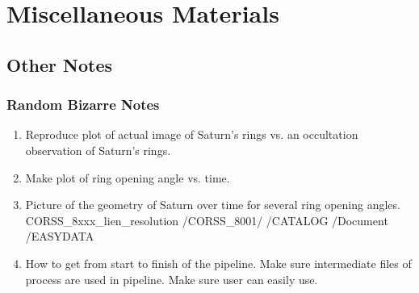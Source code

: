 \documentclass[crop=false,class=article,oneside]{standalone}
\begin{document}
    \ifx\ifphysicscourseselectromagnetismI\undefined
        \section*{Miscellaneous Materials}
        \setcounter{section}{1}
    \fi
    \subsection{Other Notes}
        \subsubsection{Random Bizarre Notes}
            \begin{enumerate}
                \item Reproduce plot of actual image of
                      Saturn's rings vs. an occultation
                      observation of Saturn's rings.
                \item Make plot of ring opening angle vs. time.
                \item Picture of the geometry of Saturn over
                      time for several ring opening angles.
                    \subitem CORSS\_8xxx\_lien\_resolution
                    \subitem /CORSS\_8001/
                        \subsubitem /CATALOG
                        \subsubitem /Document
                        \subsubitem /EASYDATA
                \item How to get from start to finish of
                      the pipeline.
                    \subitem Make sure intermediate files of
                             process are used in pipeline.
                    \subitem Make sure user can easily use.
            \end{enumerate}
\end{document}
